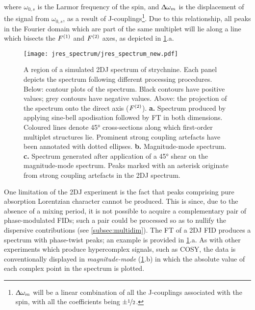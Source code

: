 where $\omega_{0,s}$ is the Larmor frequency of
the spin, and $\Updelta \omega_m$ is the displacement
of the signal from $\omega_{0,s}$, as a result of J-couplings\footnote{
    $\Updelta \omega_m$ will be a linear combination of all the J-couplings
    associated with the spin, with all the coefficients being $\pm
    \nicefrac{1}{2}$.
}. Due to this relationship, all peaks in the Fourier domain which are part of
the same multiplet will lie along a line which bisects the $F^{(1)}$ and $F^{(2)}$
axes, as depicted in \cref{fig:jres-spectrum}.a.
\begin{figure}%
    \centering%
    \texttt{[image: jres\_spectrum/jres\_spectrum\_new.pdf]}%
    \caption[
        A region of a \acs{2DJ} spectrum of strychnine, processed in different
        ways.
    ]
    {%
        A region of a simulated \acs{2DJ} spectrum of strychnine.
        Each panel depicts the spectrum following different processing
        procedures. Below: contour plots of the spectrum.
        Black contours have positive values; grey contours have negative
        values.
        Above: the projection of the spectrum onto the direct axis ($F^{(2)}$).
        \textbf{a.} Spectrum produced by applying sine-bell apodisation
        followed by \ac{FT} in both dimensions.
        Coloured lines denote \ang{45} cross-sections along which first-order
        multiplet structures lie.
        Prominent strong coupling artefacts have been annotated with dotted
        ellipses.
        \textbf{b.} Magnitude-mode spectrum.
        \textbf{c.} Spectrum generated after application of a \ang{45} shear on
        the magnitude-mode spectrum. Peaks marked with an asterisk originate
        from strong coupling artefacts in the \ac{2DJ} spectrum.
   }%
    \label{fig:jres-spectrum}%
\end{figure}%

One limitation of the \ac{2DJ} experiment is the fact that peaks comprising
pure absorption Lorentzian character cannot be produced. This is since, due
to the absence of a mixing period, it is not possible to acquire a
complementary pair of phase-modulated \acp{FID}; such a pair could be processed
so as to nullify the dispersive contributions (see \cref{subsec:multidim}).
The FT of a \ac{2DJ} \ac{FID} produces a spectrum with phase-twist
peaks; an example is provided in \cref{fig:jres-spectrum}.a. As with
other experiments which produce hypercomplex signals, such as \ac{COSY}, the
data is conventionally displayed in \emph{magnitude-mode}
(\cref{fig:jres-spectrum}.b) in which the absolute value of each complex point
in the spectrum is plotted.

